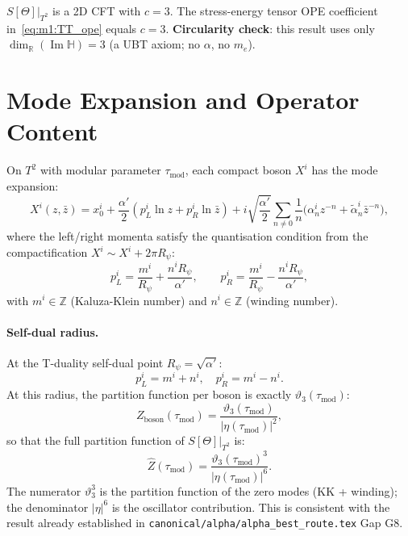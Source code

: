 \documentclass[12pt,a4paper]{article}
\theoremstyle{definition}
\theoremstyle{remark}
\begin{document}
\begin{resultbox}
$S[\Theta]|_{T^2}$ is a 2D CFT with $c = 3$.
The stress-energy tensor OPE coefficient in~\eqref{eq:m1:TT_ope} equals $c = 3$.
\textbf{Circularity check}: this result uses only $\dim_{\mathbb{R}}(\operatorname{Im}\mathbb{H}) = 3$
(a UBT axiom; no $\alpha$, no $m_e$). \quad [L0/L1 CLEAN]
\end{resultbox}

\section{Mode Expansion and Operator Content}
\label{sec:m1:modes}

On $T^2$ with modular parameter $\tau_{\mathrm{mod}}$, each compact boson $X^i$
has the mode expansion:
\begin{equation}
  X^i(z, \bar{z}) = x_0^i
    + \frac{\alpha'}{2}(p^i_L \ln z + p^i_R \ln \bar{z})
    + i\sqrt{\frac{\alpha'}{2}} \sum_{n \neq 0} \frac{1}{n}
      \bigl(\alpha^i_n z^{-n} + \tilde\alpha^i_n \bar{z}^{-n}\bigr),
  \label{eq:m1:mode_expansion}
\end{equation}
where the left/right momenta satisfy the quantisation condition from the
compactification $X^i \sim X^i + 2\pi R_\psi$:
\begin{equation}
  p^i_L = \frac{m^i}{R_\psi} + \frac{n^i R_\psi}{\alpha'},
  \qquad
  p^i_R = \frac{m^i}{R_\psi} - \frac{n^i R_\psi}{\alpha'},
  \label{eq:m1:momenta}
\end{equation}
with $m^i \in \mathbb{Z}$ (Kaluza-Klein number) and $n^i \in \mathbb{Z}$
(winding number).

\paragraph{Self-dual radius.}
At the T-duality self-dual point $R_\psi = \sqrt{\alpha'}$:
\begin{equation}
  p^i_L = m^i + n^i, \quad p^i_R = m^i - n^i.
  \label{eq:m1:selfdual_momenta}
\end{equation}
At this radius, the partition function per boson is exactly $\vartheta_3(\tau_{\mathrm{mod}})$:
\begin{equation}
  Z_{\mathrm{boson}}(\tau_{\mathrm{mod}}) = \frac{\vartheta_3(\tau_{\mathrm{mod}})}{|\eta(\tau_{\mathrm{mod}})|^2},
\end{equation}
so that the full partition function of $S[\Theta]|_{T^2}$ is:
\begin{equation}
  \hat{Z}(\tau_{\mathrm{mod}}) = \frac{\vartheta_3(\tau_{\mathrm{mod}})^3}{|\eta(\tau_{\mathrm{mod}})|^6}.
  \label{eq:m1:partition_function}
\end{equation}
The numerator $\vartheta_3^3$ is the partition function of the zero modes
(KK + winding); the denominator $|\eta|^6$ is the oscillator contribution.
This is consistent with the result already established in
\texttt{canonical/alpha/alpha\_best\_route.tex} Gap G8.
\end{document}
